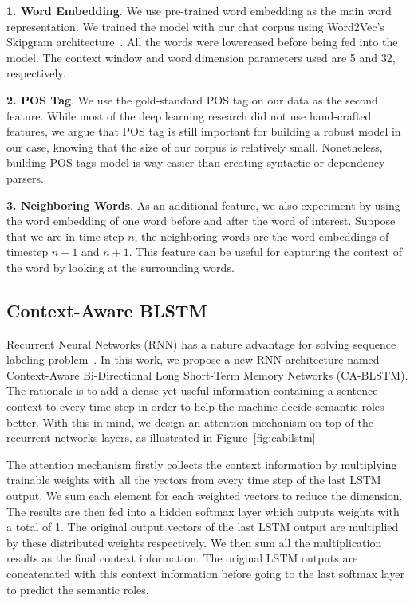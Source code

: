 \textbf{1. Word Embedding}. We use pre-trained word embedding as the main word representation. We trained the model with our chat corpus using Word2Vec’s Skipgram architecture~\cite{mikolov2013distributed}. All the words were lowercased before being fed into the model. The context window and word dimension parameters used are 5 and 32, respectively.

\textbf{2. POS Tag}. We use the gold-standard POS tag on our data as the second feature. While most of the deep learning research did not use hand-crafted features, we argue that POS tag is still important for building a robust model in our case, knowing that the size of our corpus is relatively small. Nonetheless, building POS tags model is way easier than creating syntactic or dependency parsers.

\textbf{3. Neighboring Words}. As an additional feature, we also experiment by using the word embedding of one word before and after the word of interest. Suppose that we are in time step $n$, the neighboring words are the word embeddings of timestep $n-1$ and $n+1$. This feature can be useful for capturing the context of the word by looking at the surrounding words.

\subsection{Context-Aware BLSTM}
Recurrent Neural Networks (RNN) has a nature advantage for solving sequence labeling problem~\cite{zhou2015end}. In this work, we propose a new RNN architecture named Context-Aware Bi-Directional Long Short-Term Memory Networks (CA-BLSTM). The rationale is to add a dense yet useful information containing a sentence context to every time step in order to help the machine decide semantic roles better. With this in mind, we design an attention mechanism on top of the recurrent networks layers, as illustrated in Figure~\ref{fig:cabilstm} 

The attention mechanism firstly collects the context information by multiplying trainable weights with all the vectors from every time step of the last LSTM output. We sum each element for each weighted vectors to reduce the dimension. The results are then fed into a hidden softmax layer which outputs weights with a total of 1. The original output vectors of the last LSTM output are multiplied by these distributed weights respectively. We then sum all the multiplication results as the final context information. The original LSTM outputs are concatenated with this context information before going to the last softmax layer to predict the semantic roles. 

